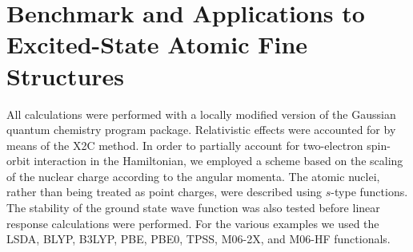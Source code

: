 \documentclass[12pt]{article}
\begin{document}
\section{Benchmark and Applications to Excited-State Atomic Fine Structures}
All calculations were performed with a locally modified version of the Gaussian quantum chemistry program package.\cite{GDVI06}
Relativistic effects were accounted for by means of the X2C method.\cite{Liu05_241102,Peng06_044102,Saue07_064102,Peng09_031104,Reiher13_184105,Cheng07_104106}
In order to partially account for two-electron spin-orbit interaction in the Hamiltonian, we employed a scheme based on the scaling of the nuclear charge according to the angular momenta.\cite{Boettger00_7809}
The atomic nuclei, rather than being treated as point charges, were described using $s$-type functions.\cite{Dyall97_207,Saue98_920}
The stability of the ground state wave function was also tested before linear response calculations were performed.
For the various examples we used the LSDA,\cite{Kohn64_B864,Nusair80_1200} BLYP,\cite{Becke88_3098,Parr88_785,Preuss89_200} B3LYP,\cite{Becke93_5648,Parr88_785} PBE,\cite{Ernzerhof96_3865} PBE0,\cite{Barone99_6158} TPSS,\cite{Scuseria03_146401} M06-2X,\cite{Truhlar08_215} and M06-HF\cite{Truhlar06_5121,Truhlar06_13126} functionals.
\end{document}
